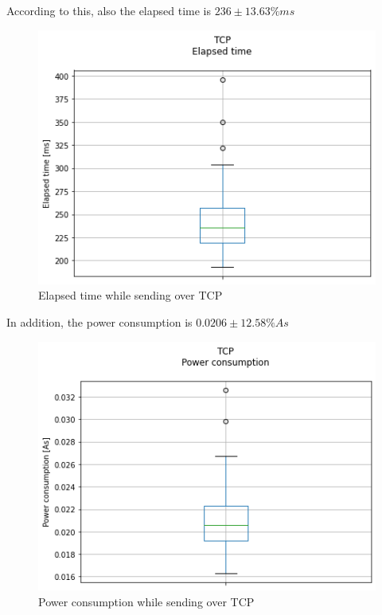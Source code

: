According to this, also the elapsed time is $236 \pm 13.63\% ms$
\linebreak
\begin{figure}[H]
\centering
\includegraphics[width = 0.7 \linewidth]{fig/udp_tcp/tcp_boxplot_time.png}
\caption{Elapsed time while sending over TCP}
\label{fig:tcp_boxplot_time}
\end{figure}
In addition, the power consumption is $0.0206 \pm 12.58\% As$
\linebreak
\begin{figure}[H]
\centering
\includegraphics[width = 0.7 \linewidth]{fig/udp_tcp/tcp_boxplot_As.png}
\caption{Power consumption while sending over TCP}
\label{fig:tcp_boxplot_As}
\end{figure}
